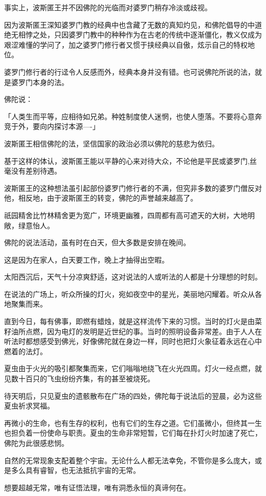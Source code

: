 \documentclass[twoside,openany]{book}
\begin{document}
事实上，波斯匿王并不因佛陀的光临而对婆罗门稍存冷淡或歧视。

因为波斯匿王深知婆罗门教的经典中也含藏了无数的真知灼见，和佛陀倡导的中道绝无相悖之处，只因婆罗门教中的种种作为在古老的传统中逐渐僵化，教义仅成为艰涩难懂的学问了，加之婆罗门修行者又惯于挟经典以自傲，炫示自己的特权地位。

婆罗门修行者的行迳令人反感而外，经典本身并没有错。也可说佛陀所说的法，就是婆罗门本身的法。

佛陀说：

「人类生而平等，应相待如兄弟。种姓制度使人迷惘，也使人堕落。不要将心意奔竞于外，要向内探讨本源----」

波斯匿王相信佛陀的法，坚信国家的政治必须以佛陀的慈悲为依归。

基于这样的体认，波斯匿王能以平静的心来对待大众，不论他是平民或婆罗门,丝毫没有差别待遇。

波斯匿王的这种想法虽引起部份婆罗门修行者的不满，但究非多数的婆罗门僧反对他，相反地，由于波斯匿王的转变，佛陀的声誉越来越高了。

祇园精舍比竹林精舍更为宽广，环境更幽雅，四周都有高可遮天的大树，大地明敞，绿意怡人。

佛陀的说法活动，虽有时在白天，但大多数是安排在晚间。

这是因为在家人，白天要工作，晚上才抽得出空暇。

太阳西沉后，天气十分凉爽舒适，这对说法的人或听法的人都是十分理想的时刻。

在说法的广场上，听众所操的灯火，宛如夜空中的星光，美丽地闪耀着。听众从各地聚集而来。

直到今日，每有佛事，即燃有蜡烛，就是这样流传下来的习惯。当时的灯火是由菜籽油所点燃，因为电灯的发明是近世纪的事。当时的照明设备非常差。由于人人在听法时都想感受到佛光，好像佛陀就在身边一样，同时也把灯火象征着永远在心中燃着的法灯。

夏虫由于火光的吸引都聚集而来，它们嗡嗡地绕飞在火光四周。灯火一经点燃，就见数十百只的飞虫纷纷齐集，有的甚至被烧死。

待天明后，只见夏虫的遗骸散布在广场的四处，佛陀每于说法后的翌晨，必为这些夏虫祈求冥福。

再微小的生命，也有生存的权利，也有它们的生存之道。它们虽微小，但终其一生也担负着一份使命与职责。夏虫的生命非常短暂，它们每在扑灯火时加速了死亡，佛陀为此很感悲悯。

自然的无常现象支配着整个宇宙。无论什么人都无法幸免，不管你是多么庞大，或是多么具有睿智，也无法抵抗宇宙的无常。

想要超越无常，唯有证悟法理，唯有洞悉永恒的真谛何在。
\end{document}
